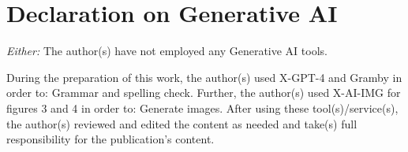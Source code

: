 \documentclass[
]{ceurart}
\begin{document}






\section*{Declaration on Generative AI}
  {\em Either:}\newline
  The author(s) have not employed any Generative AI tools.
  \newline
  
 During the preparation of this work, the author(s) used X-GPT-4 and Gramby in order to: Grammar and spelling check. Further, the author(s) used X-AI-IMG for figures 3 and 4 in order to: Generate images. After using these tool(s)/service(s), the author(s) reviewed and edited the content as needed and take(s) full responsibility for the publication’s content. 

 


\end{document}
